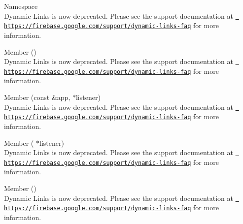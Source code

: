 \begin{DoxyRefList}
\item[Namespace \doxylink{namespacefirebase_1_1dynamic__links}{firebase\+::dynamic\+\_\+links} ]\hfill \\
\label{deprecated__deprecated000003}%
%
Dynamic Links is now deprecated. Please see the support documentation at \href{https://firebase.google.com/support/dynamic-links-faq}{\texttt{ https\+://firebase.\+google.\+com/support/dynamic-\/links-\/faq}} for more information.  
\item[Member \doxylink{namespacefirebase_1_1dynamic__links_a9ec54dc0937bd87c95af2608fe55cb49}{firebase\+::dynamic\+\_\+links\+::Fetch} ()]\hfill \\
\label{deprecated__deprecated000007}%
%
Dynamic Links is now deprecated. Please see the support documentation at \href{https://firebase.google.com/support/dynamic-links-faq}{\texttt{ https\+://firebase.\+google.\+com/support/dynamic-\/links-\/faq}} for more information.  
\item[Member \doxylink{namespacefirebase_1_1dynamic__links_a659bae907517913b293c0758eabf4af4}{firebase\+::dynamic\+\_\+links\+::Initialize} (const \doxylink{classfirebase_1_1_app}{App} \&app, \doxylink{classfirebase_1_1dynamic__links_1_1_listener}{Listener} \texorpdfstring{$\ast$}{*}listener)]\hfill \\
\label{deprecated__deprecated000004}%
%
Dynamic Links is now deprecated. Please see the support documentation at \href{https://firebase.google.com/support/dynamic-links-faq}{\texttt{ https\+://firebase.\+google.\+com/support/dynamic-\/links-\/faq}} for more information.  
\item[Member \doxylink{namespacefirebase_1_1dynamic__links_af1d4453e5b174fa63fa3fa97d3f2dbb5}{firebase\+::dynamic\+\_\+links\+::Set\+Listener} (\doxylink{classfirebase_1_1dynamic__links_1_1_listener}{Listener} \texorpdfstring{$\ast$}{*}listener)]\hfill \\
\label{deprecated__deprecated000006}%
%
Dynamic Links is now deprecated. Please see the support documentation at \href{https://firebase.google.com/support/dynamic-links-faq}{\texttt{ https\+://firebase.\+google.\+com/support/dynamic-\/links-\/faq}} for more information.  
\item[Member \doxylink{namespacefirebase_1_1dynamic__links_a08c69d38191e1a9fa69a0ef4340c969e}{firebase\+::dynamic\+\_\+links\+::Terminate} ()]\hfill \\
\label{deprecated__deprecated000005}%
%
Dynamic Links is now deprecated. Please see the support documentation at \href{https://firebase.google.com/support/dynamic-links-faq}{\texttt{ https\+://firebase.\+google.\+com/support/dynamic-\/links-\/faq}} for more information. 
\end{DoxyRefList}